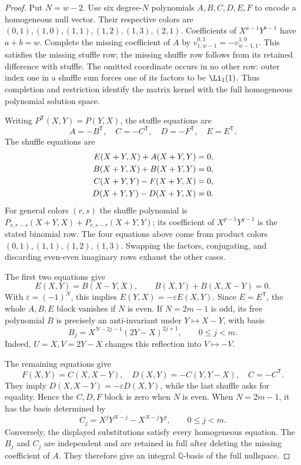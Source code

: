 \begin{proof}
Put $N=w-2$. Use six degree-$N$ polynomials $A,B,C,D,E,F$ to encode
a homogeneous null vector. Their respective colors are $(0,1),(1,0),(1,1),(1,2),(1,3),(2,1)$. Coefficients of $X^{a-1}Y^{b-1}$ have $a+b=w$.
Complete the missing coefficient of $A$ by
$v_{1,w-1}^{0,1}=-v_{w-1,1}^{1,0}$. This satisfies the missing stuffle row;
the missing shuffle row follows from its retained difference with stuffle.
The omitted coordinate occurs in no other row: outer index one in a
shuffle sum forces one of its factors to be $\Li_1(1)$.
Thus completion and restriction identify the matrix kernel with the full
homogeneous polynomial solution space.

Writing $P^{\mathsf T}(X,Y)=P(Y,X)$, the stuffle equations are
\begin{equation}\label{l4rank:eq:st}
 A=-B^{\mathsf T},\quad C=-C^{\mathsf T},\quad
 D=-F^{\mathsf T},\quad E=E^{\mathsf T}.
\end{equation}
The shuffle equations are
\begin{align}
 E(X+Y,X)+A(X+Y,Y)&=0,\notag\\
 B(X+Y,X)+B(X+Y,Y)&=0,\notag\\
 C(X+Y,Y)-F(X+Y,X)&=0,\notag\\
 D(X+Y,Y)-D(X+Y,X)&=0.\label{l4rank:eq:sh}
\end{align}
For general colors $(r,s)$ the shuffle polynomial is
$P_{s,r-s}(X+Y,X)+P_{r,s-r}(X+Y,Y)$; its coefficient of
$X^{p-1}Y^{q-1}$ is the stated binomial row. The four equations above come
from product colors $(0,1),(1,1),(1,2),(1,3)$. Swapping the factors,
conjugating, and discarding even-even imaginary rows exhaust the other cases.

The first two equations give
\[
 E(X,Y)=B(X-Y,X),\qquad B(X,Y)+B(X,X-Y)=0.
\]
With $\varepsilon=(-1)^N$, this implies
$E(Y,X)=-\varepsilon E(X,Y)$. Since $E=E^{\mathsf T}$, the whole $A,B,E$
block vanishes if $N$ is even. If $N=2m-1$ is odd, its free polynomial $B$
is precisely an anti-invariant under $Y\mapsto X-Y$, with basis
\begin{equation}\label{l4rank:eq:B-basis}
 B_j=X^{N-2j-1}(2Y-X)^{2j+1},\qquad 0\le j<m.
\end{equation}
Indeed, $U=X,V=2Y-X$ changes this reflection into $V\mapsto -V$.

The remaining equations give
\[
 F(X,Y)=C(X,X-Y),\quad D(X,Y)=-C(Y,Y-X),\quad C=-C^{\mathsf T}.
\]
They imply $D(X,X-Y)=-\varepsilon D(X,Y)$, while the last shuffle asks
for equality. Hence the $C,D,F$ block is zero when $N$ is even. When
$N=2m-1$, it has the basis determined by
\begin{equation}\label{l4rank:eq:C-basis}
 C_j=X^jY^{N-j}-X^{N-j}Y^j,\qquad 0\le j<m.
\end{equation}
Conversely, the displayed substitutions satisfy every homogeneous equation.
The $B_j$ and $C_j$ are independent and are retained in full after deleting
the missing coefficient of $A$. They therefore give an integral
$\mathbb Q$-basis of the full nullspace.


\end{proof}
